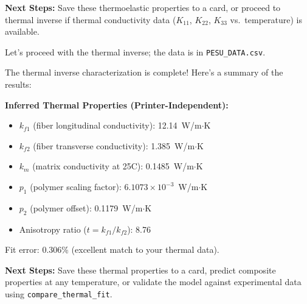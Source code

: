 \documentclass[preprint,review,10pt,number]{elsarticle}
\begin{document}
\begin{center}
\begin{tcolorbox}
\begin{tcolorbox}
\textbf{Next Steps:} Save these thermoelastic properties to a card, or proceed to thermal inverse if thermal conductivity data ($K_{11}$, $K_{22}$, $K_{33}$ vs.\ temperature) is available.
\end{tcolorbox}

\vspace{8pt}
\begin{tcolorbox}[
    breakable,
    colback=gray!8, colframe=gray!60, boxrule=0.5pt, arc=2pt,
    left=6pt, right=6pt, top=4pt, bottom=4pt,
    title={\textbf{User}}, fonttitle=\small\bfseries, coltitle=black
]
\small
Let's proceed with the thermal inverse; the data is in \texttt{PESU\_DATA.csv}.
\end{tcolorbox}
\vspace{4pt}
\begin{tcolorbox}[
    breakable,
    colback=gray!3, colframe=gray!40, boxrule=0.5pt, arc=2pt,
    left=6pt, right=6pt, top=4pt, bottom=4pt,
    title={\textbf{\texttt{MateriAl}} \hfill \texttt{\footnotesize\textcolor{gray!70!black}{\ding{110}\ run\_thermal\_inverse}}},
    fonttitle=\small\bfseries, coltitle=black
]
\small
The thermal inverse characterization is complete! Here's a summary of the results:
\vspace{4pt}

\textbf{Inferred Thermal Properties (Printer-Independent):}
\begin{itemize}[leftmargin=1.2em, itemsep=0pt, topsep=2pt]
\item $k_{f1}$ (fiber longitudinal conductivity): 12.14~W/m$\cdot$K
\item $k_{f2}$ (fiber transverse conductivity): 1.385~W/m$\cdot$K
\item $k_m$ (matrix conductivity at 25\textdegree C): 0.1485~W/m$\cdot$K
\item $p_1$ (polymer scaling factor): $6.1073\times10^{-3}$~W/m$\cdot$K
\item $p_2$ (polymer offset): 0.1179~W/m$\cdot$K
\item Anisotropy ratio ($t = k_{f1}/k_{f2}$): 8.76
\end{itemize}
\vspace{4pt}
Fit error: 0.306\% (excellent match to your thermal data).
\vspace{4pt}

\textbf{Next Steps:} Save these thermal properties to a card, predict composite properties at any temperature, or validate the model against experimental data using \texttt{compare\_thermal\_fit}.
\end{tcolorbox}


\end{tcolorbox}
\end{center}
\end{document}
